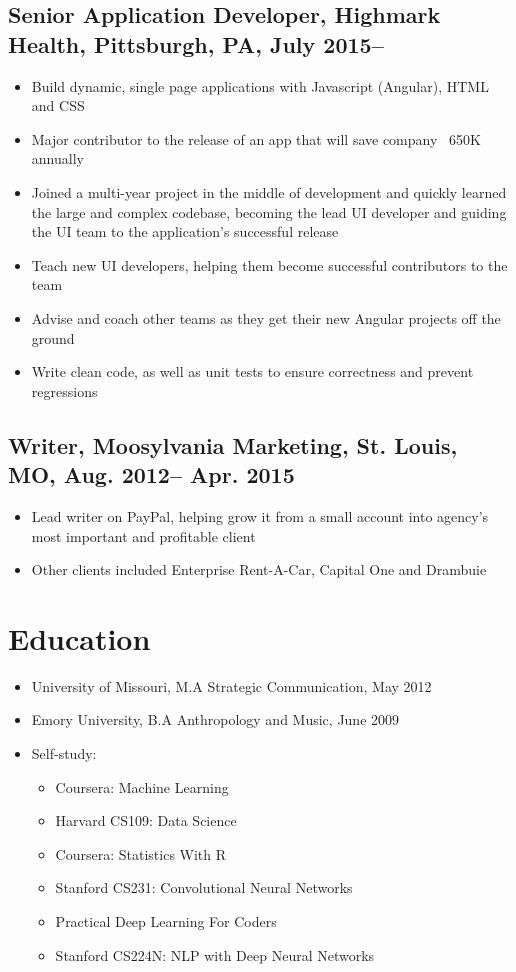 \documentclass[10pt]{article}
\begin{document}
		\subsection{\normalsize{Senior Application Developer, Highmark Health, Pittsburgh, PA, July 2015--}}
		\begin{itemize}[noitemsep]
		\item Build dynamic, single page applications with Javascript (Angular), HTML and CSS
		\item Major contributor to the release of an app that will save company ~650K annually
		\item Joined a multi-year project in the middle of development and quickly learned the large and complex codebase, becoming the lead UI developer and guiding the UI team to the application's successful release
		\item Teach new UI developers, helping them become successful contributors to the team
		\item Advise and coach other teams as they get their new Angular projects off the ground
		\item Write clean code, as well as unit tests to ensure correctness and prevent regressions
		\end{itemize}
		
	\subsection{\normalsize{Writer, Moosylvania Marketing, St. Louis, MO, Aug. 2012-- Apr. 2015}}
	\begin{itemize}[noitemsep]
		\item Lead writer on PayPal, helping grow it from a small account into agency’s most important and profitable client
		\item Other clients included Enterprise Rent-A-Car, Capital One and Drambuie
	\end{itemize}
	
	\section{Education}
		\begin{itemize}[noitemsep]
			\item University of Missouri, M.A Strategic Communication, May 2012
			\item Emory University, B.A Anthropology and Music, June 2009
			\item Self-study:
				\begin{itemize}[noitemsep]
						\item Coursera: Machine Learning 
						\item Harvard CS109: Data Science
						\item Coursera: Statistics With R 
						\item Stanford CS231: Convolutional Neural Networks
						\item Practical Deep Learning For Coders 
						\item Stanford CS224N: NLP with Deep Neural Networks
				\end{itemize}
					
				
		\end{itemize}
		
			
\end{document}
